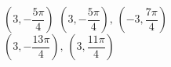 { $\left( 3, -\dfrac{5\pi}{4} \right)$}
{$\left(3, -\dfrac{5\pi}{4} \right), \, \left( -3, \dfrac{7\pi}{4} \right)$\\$\left( 3, -\dfrac{13\pi}{4} \right), \, \left( 3, \dfrac{11\pi}{4} \right)$\\}

